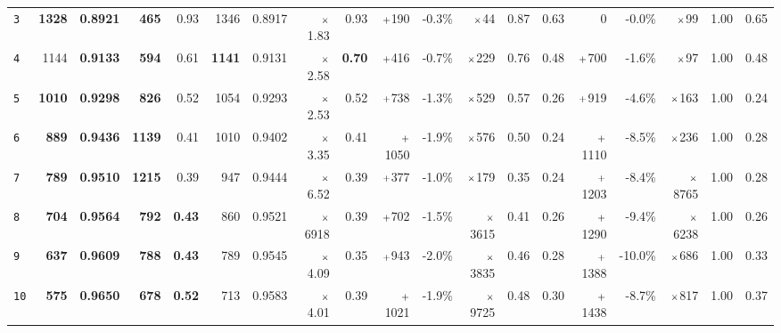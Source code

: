 \begin{tabular}{lrrrrrrrrrrrrrrrrrr}
\texttt{3} & \textbf{1328} & \textbf{0.8921} & \textbf{465} & 0.93 & 1346 & 0.8917 & $\mathsmaller{\times}$1.83 & 0.93 & $\mathsmaller{+}$190 & -0.3\% & $\mathsmaller{\times}$44 & 0.87 & 0.63 & 0 & -0.0\% & $\mathsmaller{\times}$99 & 1.00 & 0.65\\
\texttt{4} & 1144 & \textbf{0.9133} & \textbf{594} & 0.61 & \textbf{1141} & 0.9131 & $\mathsmaller{\times}$2.58 & \textbf{0.70} & $\mathsmaller{+}$416 & -0.7\% & $\mathsmaller{\times}$229 & 0.76 & 0.48 & $\mathsmaller{+}$700 & -1.6\% & $\mathsmaller{\times}$97 & 1.00 & 0.48\\
\texttt{5} & \textbf{1010} & \textbf{0.9298} & \textbf{826} & 0.52 & 1054 & 0.9293 & $\mathsmaller{\times}$2.53 & 0.52 & $\mathsmaller{+}$738 & -1.3\% & $\mathsmaller{\times}$529 & 0.57 & 0.26 & $\mathsmaller{+}$919 & -4.6\% & $\mathsmaller{\times}$163 & 1.00 & 0.24\\
\texttt{6} & \textbf{889} & \textbf{0.9436} & \textbf{1139} & 0.41 & 1010 & 0.9402 & $\mathsmaller{\times}$3.35 & 0.41 & $\mathsmaller{+}$1050 & -1.9\% & $\mathsmaller{\times}$576 & 0.50 & 0.24 & $\mathsmaller{+}$1110 & -8.5\% & $\mathsmaller{\times}$236 & 1.00 & 0.28\\
\texttt{7} & \textbf{789} & \textbf{0.9510} & \textbf{1215} & 0.39 & 947 & 0.9444 & $\mathsmaller{\times}$6.52 & 0.39 & $\mathsmaller{+}$377 & -1.0\% & $\mathsmaller{\times}$179 & 0.35 & 0.24 & $\mathsmaller{+}$1203 & -8.4\% & $\mathsmaller{\times}$8765 & 1.00 & 0.28\\
\texttt{8} & \textbf{704} & \textbf{0.9564} & \textbf{792} & \textbf{0.43} & 860 & 0.9521 & $\mathsmaller{\times}$6918 & 0.39 & $\mathsmaller{+}$702 & -1.5\% & $\mathsmaller{\times}$3615 & 0.41 & 0.26 & $\mathsmaller{+}$1290 & -9.4\% & $\mathsmaller{\times}$6238 & 1.00 & 0.26\\
\texttt{9} & \textbf{637} & \textbf{0.9609} & \textbf{788} & \textbf{0.43} & 789 & 0.9545 & $\mathsmaller{\times}$4.09 & 0.35 & $\mathsmaller{+}$943 & -2.0\% & $\mathsmaller{\times}$3835 & 0.46 & 0.28 & $\mathsmaller{+}$1388 & -10.0\% & $\mathsmaller{\times}$686 & 1.00 & 0.33\\
\texttt{10} & \textbf{575} & \textbf{0.9650} & \textbf{678} & \textbf{0.52} & 713 & 0.9583 & $\mathsmaller{\times}$4.01 & 0.39 & $\mathsmaller{+}$1021 & -1.9\% & $\mathsmaller{\times}$9725 & 0.48 & 0.30 & $\mathsmaller{+}$1438 & -8.7\% & $\mathsmaller{\times}$817 & 1.00 & 0.37\\
\bottomrule
\end{tabular}
